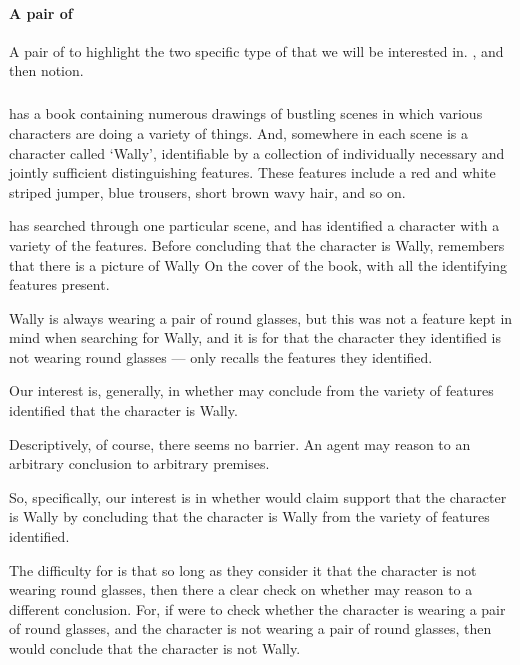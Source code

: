 \paragraph{A pair of }

\begin{note}
  A pair of  to highlight the two specific type of  that we will be interested in.
  , and then notion.
\end{note}

\subparagraph{}

\begin{note}[Wally]
  \begin{illustration}
    \label{illu:CS:wheres-wally}
     has a book containing numerous drawings of bustling scenes in which various characters are doing a variety of things.
    And, somewhere in each scene is a character called `Wally', identifiable by a collection of individually necessary and jointly sufficient distinguishing features.
    These features include a red and white striped jumper, blue trousers, short brown wavy hair, and so on.

     has searched through one particular scene, and has identified a character with a variety of the features.
    Before concluding that the character is Wally,  remembers that there is a picture of Wally On the cover of the book, with all the identifying features present.

    Wally is always wearing a pair of round glasses, but this was not a feature  kept in mind when searching for Wally, and it is \epVAd{} for  that the character they identified is not wearing round glasses  ---  only recalls the features they identified.
  \end{illustration}

  Our interest is, generally, in whether  may conclude from the variety of features identified that the character is Wally.

  Descriptively, of course, there seems no barrier.
  An agent may reason to an arbitrary conclusion to arbitrary premises.

  So, specifically, our interest is in whether  would claim support that the character is Wally by concluding that the character is Wally from the variety of features identified.

  The difficulty for  is that so long as they consider it \epVAd{} that the character is not wearing round glasses, then there a clear check on whether  may reason to a different conclusion.
  For, if  were to check whether the character is wearing a pair of round glasses, and the character is not wearing a pair of round glasses, then  would conclude that the character is not Wally.
\end{note}

